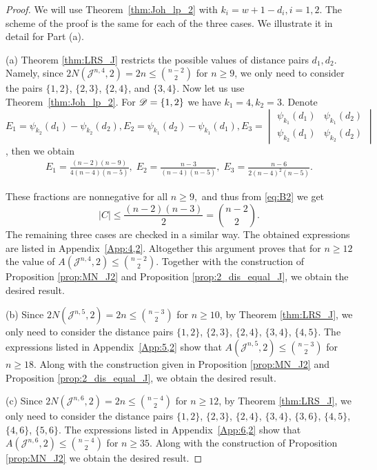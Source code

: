 \documentclass{amsart}
\newcommand{\cJ}{\mathcal{J}}
\begin{document}
\begin{proof} We will use Theorem~\ref{thm:Joh_lp_2} with $k_i = w+1-d_i, i=1,2$. The scheme of the proof is the same for each of the three cases. We illustrate it in detail for Part (a).

(a) Theorem  \ref{thm:LRS_J} restricts the possible values of distance pairs $d_1,d_2$. Namely, 
since $2N(\cJ^{n, 4}, 2) = 2n \leq \binom{n-2}{2}$ for $n \geq 9$, we only need to consider the 
pairs $\{1, 2\}$, $\{2, 3\}$, $\{2, 4\}$, and $\{3, 4\}$. Now let us use Theorem~\ref{thm:Joh_lp_2}. For $\mathscr{D}=\{1,2\}$ we
have $k_1=4,k_2=3.$ Denote $E_1=\psi_{k_2}(d_1)-\psi_{k_2}(d_2), E_2=\psi_{k_1}(d_2)-\psi_{k_1}(d_1), E_3=\begin{vmatrix} \psi_{k_1}(d_1) & \psi_{k_1}(d_2) \\ \psi_{k_2}(d_1) & \psi_{k_2}(d_2) \end{vmatrix}$, then we obtain
  \begin{gather*}
  E_1=\frac{(n-2)(n-9)}{4(n-4)(n-5)}, \;E_2=\frac{n-3}{(n-4)(n-5)},\;
  E_3=\frac{n-6}{2(n-4)^2(n-5)}.
  \end{gather*}

These fractions are nonnegative for all $n\ge 9,$ and thus from \eqref{eq:B2} we get
  $$
  |C| \leq \frac{(n-2)(n-3)}{2} = \binom{n-2}{2}.
  $$
The remaining three cases are checked in a similar way. The obtained expressions are listed in Appendix~\ref{App:4,2}. Altogether
this argument proves that for $n\ge 12$ the value of $A(\cJ^{n, 4}, 2)\le \binom{n-2}2.$ Together with the construction of Proposition \ref{prop:MN_J2} and Proposition \ref{prop:2_dis_equal_J}, we obtain the desired result.

(b) Since $2N(\cJ^{n, 5}, 2) = 2n \leq \binom{n-3}{2}$ for $n \geq 10$, by Theorem \ref{thm:LRS_J}, we only need to consider the distance pairs $\{1, 2\}$, $\{2, 3\}$, $\{2, 4\}$, $\{3, 4\}$, $\{4, 5\}$. The expressions listed in Appendix~\ref{App:5,2}
show that $A(\cJ^{n, 5}, 2)\le \binom{n-3}{2}$ for $n\ge 18$. Along with the construction given in Proposition \ref{prop:MN_J2} and Proposition \ref{prop:2_dis_equal_J}, we obtain the desired result.

(c) Since $2N(\cJ^{n, 6}, 2) = 2n \leq \binom{n-4}{2}$ for $n \geq 12$, by Theorem \ref{thm:LRS_J}, we only need to consider the distance pairs $\{1, 2\}$, $\{2, 3\}$, $\{2, 4\}$, $\{3, 4\}$, $\{3, 6\}$, $\{4, 5\}$, $\{4, 6\}$, $\{5, 6\}$.
The expressions listed in Appendix~\ref{App:6,2}
show that $A(\cJ^{n, 6}, 2)\le \binom{n-4}{2}$ for $n\ge 35$. Along with the construction of Proposition \ref{prop:MN_J2}
we obtain the desired result.
\end{proof}
\end{document}
